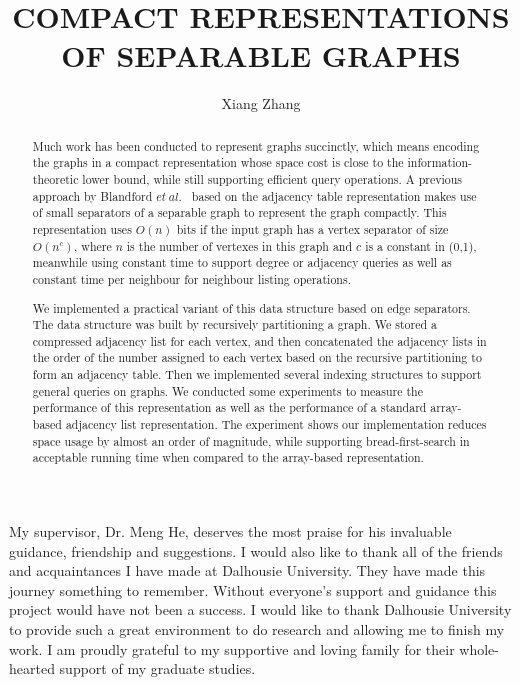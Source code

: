\documentclass[12pt,glossary]{dalthesis}
\begin{document}
\macs  %
\title{COMPACT REPRESENTATIONS OF SEPARABLE GRAPHS}
\author{Xiang Zhang}





\frontmatter





\begin{abstract}
Much work has been conducted to represent graphs succinctly, which means encoding the graphs in a compact representation whose space cost is close to the information-theoretic lower bound, while still supporting efficient query operations. A previous approach by Blandford $et \ al.$~\cite{compact-representation} based on the adjacency table representation makes use of small separators of a separable graph to represent the graph compactly. This representation uses $O(n)$ bits if the input graph has a vertex separator of size $O(n^{c})$, where $n$ is the number of vertexes in this graph and $c$ is a constant in (0,1), meanwhile using constant time to support degree or adjacency queries as well as constant time per neighbour for neighbour listing operations.


We implemented a practical variant of this data structure based on edge separators. The data structure was built by recursively partitioning a graph. We stored a compressed adjacency list for each vertex, and then concatenated the adjacency lists in the order of the number assigned to each vertex based on the recursive partitioning to form an adjacency table. Then we implemented several indexing structures to support general queries on graphs. We conducted some experiments to measure the performance of this representation as well as the performance of a standard array-based adjacency list representation. The experiment shows our implementation reduces space usage by almost an order of magnitude, while supporting bread-first-search in acceptable running time when compared to the array-based representation.
\end{abstract}

\printglossary

\begin{acknowledgements}
My supervisor, Dr. Meng He, deserves the most praise for his invaluable guidance, friendship and suggestions. I would also like to thank all of the friends and acquaintances I have made at Dalhousie University. They have made this journey something to remember. Without everyone’s support and guidance this project would have not been a success.
I would like to thank Dalhousie University to provide such a great environment
to do research and allowing me to finish my work.
I am proudly grateful to my supportive and loving family for their whole-hearted
support of my graduate studies.
\end{acknowledgements}
\end{document}
